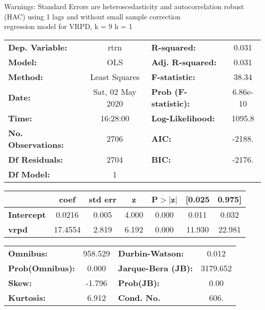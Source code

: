 Warnings: \newline
 [1] Standard Errors are heteroscedasticity and autocorrelation robust (HAC) using 1 lags and without small sample correction\\ 

regression model for VRPD, k = 9 h = 1\begin{center}
\begin{tabular}{lclc}
\toprule
\textbf{Dep. Variable:}    &       rtrn       & \textbf{  R-squared:         } &     0.031   \\
\textbf{Model:}            &       OLS        & \textbf{  Adj. R-squared:    } &     0.031   \\
\textbf{Method:}           &  Least Squares   & \textbf{  F-statistic:       } &     38.34   \\
\textbf{Date:}             & Sat, 02 May 2020 & \textbf{  Prob (F-statistic):} &  6.86e-10   \\
\textbf{Time:}             &     16:28:00     & \textbf{  Log-Likelihood:    } &    1095.8   \\
\textbf{No. Observations:} &        2706      & \textbf{  AIC:               } &    -2188.   \\
\textbf{Df Residuals:}     &        2704      & \textbf{  BIC:               } &    -2176.   \\
\textbf{Df Model:}         &           1      & \textbf{                     } &             \\
\bottomrule
\end{tabular}
\begin{tabular}{lcccccc}
                   & \textbf{coef} & \textbf{std err} & \textbf{z} & \textbf{P$> |$z$|$} & \textbf{[0.025} & \textbf{0.975]}  \\
\midrule
\textbf{Intercept} &       0.0216  &        0.005     &     4.000  &         0.000        &        0.011    &        0.032     \\
\textbf{vrpd}      &      17.4554  &        2.819     &     6.192  &         0.000        &       11.930    &       22.981     \\
\bottomrule
\end{tabular}
\begin{tabular}{lclc}
\textbf{Omnibus:}       & 958.529 & \textbf{  Durbin-Watson:     } &    0.012  \\
\textbf{Prob(Omnibus):} &   0.000 & \textbf{  Jarque-Bera (JB):  } & 3179.652  \\
\textbf{Skew:}          &  -1.796 & \textbf{  Prob(JB):          } &     0.00  \\
\textbf{Kurtosis:}      &   6.912 & \textbf{  Cond. No.          } &     606.  \\
\bottomrule
\end{tabular}
\end{center}

